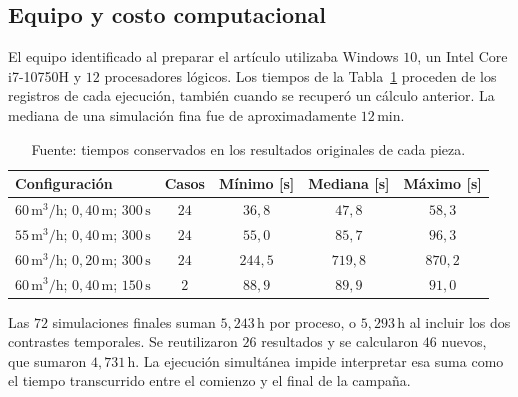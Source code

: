 \subsection{Equipo y costo computacional}
El equipo identificado al preparar el artículo utilizaba Windows $10$, un Intel Core i7-10750H y $12$ procesadores lógicos. Los tiempos de la Tabla~\ref{tab:tiempos-corridas} proceden de los registros de cada ejecución, también cuando se recuperó un cálculo anterior. La mediana de una simulación fina fue de aproximadamente $12\,\mathrm{min}$.
\begin{table}[htbp]
  \centering
  \caption{Duraciones registradas de las corridas a $672\,\mathrm h$}
  \label{tab:tiempos-corridas}
  \small
  \begin{tabular}{lcccc}
    \toprule
    Configuración & Casos & Mínimo [s] & Mediana [s] & Máximo [s] \\
    \midrule
    $60\,\mathrm{m^3/h}$; $0{,}40\,\mathrm m$; $300\,\mathrm s$ & $24$ & $36{,}8$ & $47{,}8$ & $58{,}3$ \\
    $55\,\mathrm{m^3/h}$; $0{,}40\,\mathrm m$; $300\,\mathrm s$ & $24$ & $55{,}0$ & $85{,}7$ & $96{,}3$ \\
    $60\,\mathrm{m^3/h}$; $0{,}20\,\mathrm m$; $300\,\mathrm s$ & $24$ & $244{,}5$ & $719{,}8$ & $870{,}2$ \\
    $60\,\mathrm{m^3/h}$; $0{,}40\,\mathrm m$; $150\,\mathrm s$ & $2$ & $88{,}9$ & $89{,}9$ & $91{,}0$ \\
    \bottomrule
  \end{tabular}
  \captionsetup{skip=2pt}
  \caption*{Fuente: tiempos conservados en los resultados originales de cada pieza.}
\end{table}
Las $72$ simulaciones finales suman $5{,}243\,\mathrm h$ por proceso, o $5{,}293\,\mathrm h$ al incluir los dos contrastes temporales. Se reutilizaron $26$ resultados y se calcularon $46$ nuevos, que sumaron $4{,}731\,\mathrm h$. La ejecución simultánea impide interpretar esa suma como el tiempo transcurrido entre el comienzo y el final de la campaña.
